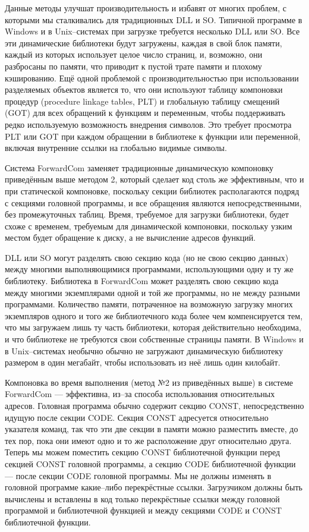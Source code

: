 \documentclass[forwardcom.tex]{subfiles}
\begin{document}
Данные методы улучшат производительность и избавят от многих проблем, с которыми мы сталкивались для традиционных DLL и SO. Типичной программе в Windows и в Unix--системах при загрузке требуется несколько  DLL или SO. Все эти динамические библиотеки  будут загружены, каждая в свой блок памяти, каждый из которых использует целое число страниц, и, возможно, они разбросаны по памяти, что приводит к пустой трате памяти и плохому кэшированию. Ещё одной проблемой с производительностью при использовании разделяемых объектов является то, что они используют таблицу компоновки процедур (procedure linkage tables, PLT) и глобальную таблицу смещений (GOT) для всех обращений к функциям и переменным, чтобы поддерживать редко используемую возможность внедрения символов. Это требует просмотра  PLT или GOT при каждом обращении в библиотеке к функции или переменной, включая внутренние ссылки на глобально видимые символы.

Система ForwardCom заменяет традиционные динамическую компоновку приведённым выше методом 2, который сделает код столь же эффективным, что и при статической компоновке, поскольку секции библиотек располагаются подряд с секциями головной программы, и все обращения являются непосредственными, без промежуточных таблиц. Время, требуемое для загрузки библиотеки, будет схоже с временем, требуемым для динамической компоновки, поскольку узким местом будет обращение к диску, а не вычисление адресов функций.

DLL или SO могут разделять свою секцию кода (но не свою секцию данных) между многими выполняющимися программами, использующими одну и ту же библиотеку. Библиотека в ForwardCom может разделять свою секцию кода между многими экземплярами одной и той же программы, но не между разными программами. Количество памяти, потраченное на возможную загрузку многих экземпляров одного и того же библиотечного кода более чем компенсируется тем, что мы загружаем лишь ту часть библиотеки, которая действительно необходима, и что библиотеке не требуются свои собственные страницы памяти. В Windows и в Unix--системах необычно обычно не загружают динамическую библиотеку размером в один мегабайт, чтобы использовать из неё лишь один килобайт.

Компоновка во время выполнения (метод №2 из приведённых выше) в системе ForwardCom --- эффективна, из--за способа использования относительных адресов. Головная программа обычно содержит секцию CONST, непосредственно идущую после секции CODE. Секция CONST адресуется относительно указателя команд, так что эти две секции в памяти можно разместить вместе, до тех пор, пока они имеют одно и то же расположение друг относительно друга. Теперь мы можем поместить секцию CONST библиотечной функции перед секцией CONST головной программы, а секцию CODE библиотечной функции --- после секции CODE головной программы. Мы не должны изменять в головной программе какие--либо перекрёстные ссылки. Загрузчиком должны быть вычислены и вставлены в код только перекрёстные ссылки между головной программой и библиотечной функцией и между секциями CODE и CONST библиотечной функции.
\end{document}

